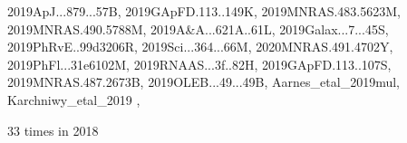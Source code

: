 \documentclass[12pt]{article}
\begin{document}
\begin{description}
{2019ApJ...879...57B,%
2019GApFD.113..149K,%
2019MNRAS.483.5623M,%
2019MNRAS.490.5788M,%
2019A&A...621A..61L,%
2019Galax...7...45S,%
2019PhRvE..99d3206R,%
2019Sci...364...66M,%
2020MNRAS.491.4702Y,%
2019PhFl...31e6102M,%
2019RNAAS...3f..82H,%
2019GApFD.113..107S,%
2019MNRAS.487.2673B,%
2019OLEB...49...49B,%
Aarnes_etal_2019mul,%
Karchniwy_etal_2019%
},\item
\item %
33 times in 2018 \citep{
2018AN....339..127K,%
2018A&A...614A.101V,%
2018A&A...616A..72W,%
2018A&A...609A..51W,%
2018JAtS...75.3469L,%
2018arXiv181007475L,%
}
\end{description}
\end{document}
